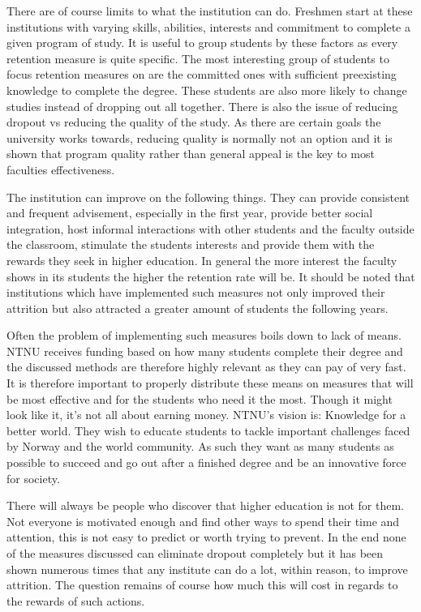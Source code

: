 \bigskip\noindent
There are of course limits to what the institution can do.
Freshmen start at these institutions with varying skills, abilities, interests and commitment to complete a given program of study.
It is useful to group students by these factors as every retention measure is quite specific.
The most interesting group of students to focus retention measures on are the committed ones with sufficient preexisting knowledge to complete the degree.
These students are also more likely to change studies instead of dropping out all together.
There is also the issue of reducing dropout vs reducing the quality of the study.
As there are certain goals the university works towards, reducing quality is normally not an option and it is shown that program quality rather than general appeal is the key to most faculties effectiveness.

\bigskip\noindent
The institution can improve on the following things.
They can provide consistent and frequent advisement, especially in the first year,
provide better social integration,
host informal interactions with other students and the faculty outside the classroom,
stimulate the students interests and provide them with the rewards they seek in higher education.
In general the more interest the faculty shows in its students the higher the retention rate will be.
It should be noted that institutions which have implemented such measures not only improved their attrition but also attracted a greater amount of students the following years.

\bigskip\noindent
Often the problem of implementing such measures boils down to lack of means.
NTNU receives funding based on how many students complete their degree and the discussed methods are therefore highly relevant as they can pay of very fast.
It is therefore important to properly distribute these means on measures that will be most effective and for the students who need it the most.
Though it might look like it, it's not all about earning money.
NTNU's vision is: Knowledge for a better world.
They wish to educate students to tackle important challenges faced by Norway and the world community.
As such they want as many students as possible to succeed and go out after a finished degree and be an innovative force for society. 

\bigskip\noindent
There will always be people who discover that higher education is not for them.
Not everyone is motivated enough and find other ways to spend their time and attention, this is not easy to predict or worth trying to prevent.
In the end none of the measures discussed can eliminate dropout completely but it has been shown numerous times that any institute can do a lot, within reason, to improve attrition. 
The question remains of course how much this will cost in regards to the rewards of such actions.
